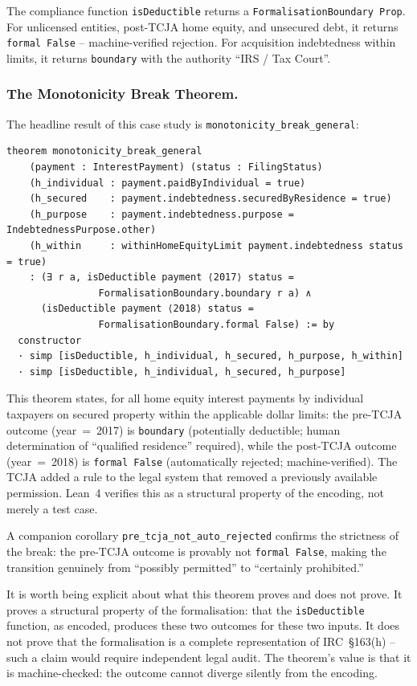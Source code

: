 \documentclass[runningheads]{llncs}
\begin{document}
The compliance function \texttt{isDeductible} returns a
\texttt{FormalisationBoundary Prop}. For unlicensed entities, post-TCJA home
equity, and unsecured debt, it returns \texttt{formal~False} -- machine-verified
rejection. For acquisition indebtedness within limits, it returns
\texttt{boundary} with the authority ``IRS / Tax Court''.

\subsubsection{The Monotonicity Break Theorem.}

The headline result of this case study is \texttt{monotonicity\_break\_general}:

\begin{lstlisting}[language=lean4]
theorem monotonicity_break_general
    (payment : InterestPayment) (status : FilingStatus)
    (h_individual : payment.paidByIndividual = true)
    (h_secured    : payment.indebtedness.securedByResidence = true)
    (h_purpose    : payment.indebtedness.purpose = IndebtednessPurpose.other)
    (h_within     : withinHomeEquityLimit payment.indebtedness status = true)
    : (∃ r a, isDeductible payment ⟨2017⟩ status =
                FormalisationBoundary.boundary r a) ∧
      (isDeductible payment ⟨2018⟩ status =
                FormalisationBoundary.formal False) := by
  constructor
  · simp [isDeductible, h_individual, h_secured, h_purpose, h_within]
  · simp [isDeductible, h_individual, h_secured, h_purpose]
\end{lstlisting}

This theorem states, for all home equity interest payments by individual
taxpayers on secured property within the applicable dollar limits: the pre-TCJA
outcome (year~=~2017) is \texttt{boundary} (potentially deductible; human
determination of ``qualified residence'' required), while the post-TCJA outcome
(year~=~2018) is \texttt{formal~False} (automatically rejected;
machine-verified). The TCJA added a rule to the legal system that removed a
previously available permission. Lean~4 verifies this as a structural property
of the encoding, not merely a test case.

A companion corollary \texttt{pre\_tcja\_not\_auto\_rejected} confirms the
strictness of the break: the pre-TCJA outcome is provably not
\texttt{formal~False}, making the transition genuinely from ``possibly
permitted'' to ``certainly prohibited.''

It is worth being explicit about what this theorem proves and does not prove. It
proves a structural property of the formalisation: that the \texttt{isDeductible}
function, as encoded, produces these two outcomes for these two inputs. It does
not prove that the formalisation is a complete representation of IRC~\S163(h) --
such a claim would require independent legal audit. The theorem's value is that
it is machine-checked: the outcome cannot diverge silently from the encoding.
\end{document}
